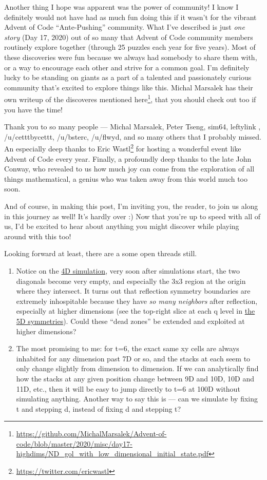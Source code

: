 \documentclass[]{article}
\renewcommand{\href}[2]{#2\footnote{\url{#1}}}
\begin{document}
Another thing I hope was apparent was the power of community! I know I
definitely would not have had as much fun doing this if it wasn't for the
vibrant Advent of Code ``Ante-Pushing'' community. What I've described is just
\emph{one story} (Day 17, 2020) out of so many that Advent of Code community
members routinely explore together (through 25 puzzles each year for five
years). Most of these discoveries were fun because we always had somebody to
share them with, or a way to encourage each other and strive for a common goal.
I'm definitely lucky to be standing on giants as a part of a talented and
passionately curious community that's excited to explore things like this.
Michal Marsalek
\href{https://github.com/MichalMarsalek/Advent-of-code/blob/master/2020/misc/day17-highdims/ND_gol_with_low_dimensional_initial_state.pdf}{has
their own writeup of the discoveres mentioned here}, that you should check out
too if you have the time!

Thank you to so many people --- Michal Marsalek, Peter Tseng, sim64, leftylink ,
/u/cetttbycettt, /u/bsterc, /u/flwyd, and so many others that I probably missed.
An especially deep thanks to \href{https://twitter.com/ericwastl}{Eric Wastl}
for hosting a wonderful event like Advent of Code every year. Finally, a
profoundly deep thanks to the late John Conway, who revealed to us how much joy
can come from the exploration of all things mathematical, a genius who was taken
away from this world much too soon.

And of course, in making this post, I'm inviting you, the reader, to join us
along in this journey as well! It's hardly over :) Now that you're up to speed
with all of us, I'd be excited to hear about anything you might discover while
playing around with this too!

Looking forward at least, there are a some open threads still.

\begin{enumerate}
\def\labelenumi{\arabic{enumi}.}
\tightlist
\item
  Notice on the \protect\hyperlink{gol4D}{4D simulation}, very soon after
  simulations start, the two diagonals become very empty, and especially the 3x3
  region at the origin where they intersect. It turns out that reflection
  symmetry boundaries are extremely inhospitable because they have \emph{so many
  neighbors} after reflection, especially at higher dimensions (see the
  top-right slice at each q level in \protect\hyperlink{golSyms5D}{the 5D
  symmetries}). Could these ``dead zones'' be extended and exploited at higher
  dimensions?
\item
  The most promising to me: for t=6, the exact same xy cells are always
  inhabited for any dimension past 7D or so, and the stacks at each seem to only
  change slightly from dimension to dimension. If we can analytically find how
  the stacks at any given position change between 9D and 10D, 10D and 11D, etc.,
  then it will be easy to jump directly to t=6 at 100D without simulating
  anything. Another way to say this is --- can we simulate by fixing t and
  stepping d, instead of fixing d and stepping t?
\end{enumerate}
\end{document}
